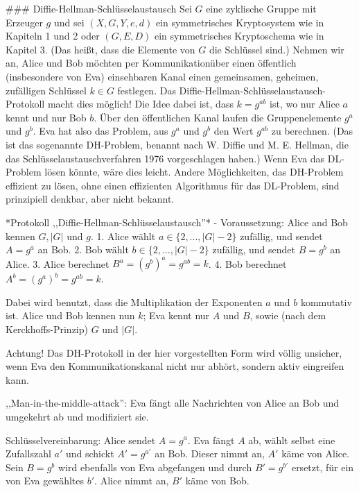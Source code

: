 \documentclass[a4paper]{article}
\begin{document}
\begin{multicols}{3}
{{{{        ### Diffie-Hellman-Schlüsselaustausch
        Sei $G$ eine zyklische Gruppe mit Erzeuger $g$ und sei $(X,G,Y,e,d)$ ein symmetrisches Kryptosystem wie in Kapiteln 1 und 2 oder $(G,E,D)$ ein symmetrisches Kryptoschema wie in Kapitel 3. (Das heißt, dass die Elemente von $G$ die Schlüssel sind.) Nehmen wir an, Alice und Bob möchten per Kommunikationüber einen öffentlich (insbesondere von Eva) einsehbaren Kanal einen gemeinsamen, geheimen, zufälligen Schlüssel $k\in G$ festlegen. Das Diffie-Hellman-Schlüsselaustausch-Protokoll macht dies möglich!
        Die Idee dabei ist, dass $k=g^{ab}$ ist, wo nur Alice $a$ kennt und nur Bob $b$. Über den öffentlichen Kanal laufen die Gruppenelemente $g^a$ und $g^b$. Eva hat also das Problem, aus $g^a$ und $g^b$ den Wert $g^{ab}$ zu berechnen. (Das ist das sogenannte DH-Problem,
        benannt nach W. Diffie und M. E. Hellman, die das Schlüsselaustauschverfahren 1976 vorgeschlagen haben.) Wenn Eva das DL-Problem lösen könnte, wäre dies leicht. Andere Möglichkeiten, das DH-Problem effizient zu lösen, ohne einen effizienten Algorithmus für das DL-Problem, sind prinzipiell denkbar, aber nicht bekannt.

        *Protokoll ,,Diffie-Hellman-Schlüsselaustausch''*
        - Voraussetzung: Alice and Bob kennen $G,|G|$ und $g$.
        1. Alice wählt $a\in\{2 ,...,|G|- 2\}$ zufällig, und sendet $A=g^a$ an Bob.
        2. Bob wählt $b\in\{2 ,...,|G|-2\}$ zufällig, und sendet $B=g^b$ an Alice.
        3. Alice berechnet $B^a= (g^b)^a=g^{ab}=k$.
        4. Bob berechnet $A^b= (g^a)^b=g^{ab}=k$.

        Dabei wird benutzt, dass die Multiplikation der Exponenten $a$ und $b$ kommutativ ist. Alice und Bob kennen nun $k$; Eva kennt nur $A$ und $B$, sowie (nach dem Kerckhoffs-Prinzip) $G$ und $|G|$.

        Achtung! Das DH-Protokoll in der hier vorgestellten Form wird völlig unsicher, wenn Eva den Kommunikationskanal nicht nur abhört, sondern aktiv eingreifen kann.

        ,,Man-in-the-middle-attack'': Eva fängt alle Nachrichten von Alice an Bob und umgekehrt ab und modifiziert sie.

        Schlüsselvereinbarung: Alice sendet $A=g^a$. Eva fängt $A$ ab, wählt selbst eine Zufallszahl $a′$ und schickt $A′=g^{a′}$ an Bob. Dieser nimmt an, $A′$ käme von Alice. Sein $B=g^b$ wird ebenfalls von Eva abgefangen und durch $B′=g^{b′}$ ersetzt, für ein von Eva gewähltes $b′$. Alice nimmt an, $B′$ käme von Bob.

}}}}
\end{multicols}
\end{document}
